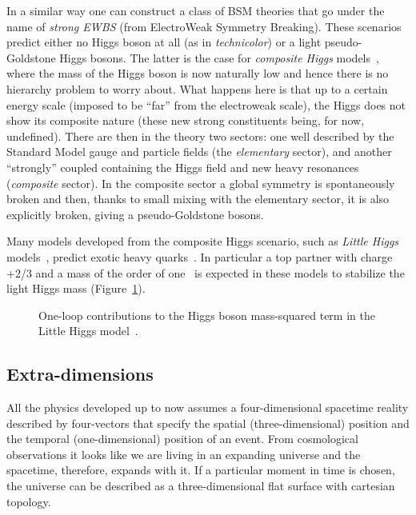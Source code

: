 In a similar way one can construct 
a class of BSM theories that go under the name
of {\it strong EWBS} (from ElectroWeak Symmetry Breaking).
These scenarios predict either no Higgs boson at all 
(as in {\it technicolor})
or a light pseudo-Goldstone Higgs bosons. The latter
is the case for {\it composite Higgs} models~\cite{Vecchi:2013bja,delAguila:2010vg}, 
where the mass of the Higgs boson is now naturally low and
hence there is no hierarchy problem to worry about.
What happens here is that up to a certain energy scale
(imposed to be ``far'' from the electroweak scale), the
Higgs does not show its composite nature (these new strong
constituents being, for now, undefined). There are then
in the theory two sectors: one well described by 
the Standard Model gauge and particle fields (the 
{\it elementary} sector), and another ``strongly'' coupled
containing the Higgs field and new heavy resonances 
({\it composite} sector).
In the composite sector a global symmetry is spontaneously 
broken and then, thanks to small mixing with the
elementary sector, it is also explicitly broken, giving
a pseudo-Goldstone bosons. 

Many models developed from the composite Higgs scenario,
such as {\it Little Higgs} models~\cite{Schmaltz:2005ky,ArkaniHamed:2001nc}, 
predict exotic heavy quarks~\cite{Contino:2008hi,Mrazek:2009yu}.
In particular a top partner with charge +2/3 and
a mass of the order of one \tev\ is expected in these
models to stabilize the light Higgs mass (Figure~\ref{fig:vltloop}).
\begin{figure}[htb]\begin{center}
	\caption{One-loop contributions to the Higgs boson mass-squared term 
          in the Little Higgs model~\cite{Perelstein:2003wd}.\label{fig:vltloop}}
\end{center}\end{figure}


\subsection{Extra-dimensions}\label{sec:extradimensions}

All the physics developed up to now assumes a 
four-dimensional spacetime reality described 
by four-vectors that specify the spatial (three-dimensional) 
position and the temporal (one-dimensional) position of
an event.
From cosmological observations it looks like
we are living in an expanding universe and the
spacetime, therefore, expands with it.
If a particular moment in time is chosen, the
universe can be described as a three-dimensional 
flat surface with cartesian topology.

